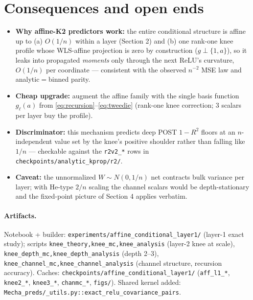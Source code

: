 \documentclass[10pt]{article}
\begin{document}
\section{Consequences and open ends}
\begin{itemize}
\item \textbf{Why affine-K2 predictors work:} the entire conditional structure is affine up to
(a) $O(1/n)$ within a layer (Section 2) and (b) one rank-one knee profile whose WLS-affine
projection is zero by construction ($g\perp\{1,a\}$), so it leaks into propagated \emph{moments}
only through the next ReLU's curvature, $O(1/n)$ per coordinate --- consistent with the observed
$n^{-2}$ MSE law and analytic$=$binned parity.
\item \textbf{Cheap upgrade:} augment the affine family with the single basis function
$g_\ell(a)$ from \eqref{eq:recursion}--\eqref{eq:tweedie} (rank-one knee correction; 3 scalars
per layer buy the profile).
\item \textbf{Discriminator:} this mechanism predicts deep POST $1-R^2$ floors at an
$n$-independent value set by the knee's positive shoulder rather than falling like $1/n$ ---
checkable against the \texttt{r2v2\_*} rows in \texttt{checkpoints/analytic\_kprop/r2/}.
\item \textbf{Caveat:} the unnormalized $W\sim N(0,1/n)$ net contracts bulk variance per layer;
with He-type $2/n$ scaling the channel scalars would be depth-stationary and the fixed-point
picture of Section 4 applies verbatim.
\end{itemize}

\paragraph{Artifacts.}
Notebook + builder: \texttt{experiments/affine\_conditional\_layer1/} (layer-1 exact study);
scripts \texttt{knee\_theory,knee\_mc,knee\_analysis} (layer-2 knee at scale),
\texttt{knee\_depth\_mc,knee\_depth\_analysis} (depth 2--3),
\texttt{knee\_channel\_mc,knee\_channel\_analysis} (channel structure, recursion accuracy).
Caches: \texttt{checkpoints/affine\_conditional\_layer1/} (\texttt{aff\_l1\_*},
\texttt{knee2\_*}, \texttt{knee3\_*}, \texttt{chanmc\_*}, \texttt{figs/}).
Shared kernel added: \texttt{Mecha\_preds/\_utils.py::exact\_relu\_covariance\_pairs}.
\end{document}
